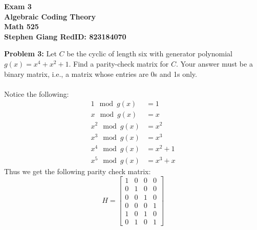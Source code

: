 \documentclass[11pt]{article}
\newcommand{\skipline}{\vspace{\baselineskip}}
\newenvironment{problem}[1]{\textbf{Problem #1: }}{\newpage}
\begin{document}
	
	\begin{center}
		\textbf{Exam 3} \\
		\textbf{Algebraic Coding Theory} \\
		\textbf{Math 525} \\
		\textbf{Stephen Giang RedID: 823184070} \\
		\skipline \skipline
	\end{center}
	
	\begin{problem}{3}
		Let $C$ be the cyclic of length six with generator polynomial $g(x) = x^4 + x^2 + 1$. Find a parity-check matrix for $C$. Your answer must be a binary matrix, i.e., a matrix whose entries are 0s and 1s only.
		\\ \\
		Notice the following:
		\begin{align*}
			1 \mod g(x) &= 1 \\
			x \mod g(x) &= x \\
			x^2 \mod g(x) &= x^2 \\
			x^3 \mod g(x) &= x^3 \\
			x^4 \mod g(x) &= x^2 + 1 \\
			x^5 \mod g(x) &= x^3 + x
		\end{align*}
		Thus we get the following parity check matrix:
		\[H = \left[\begin{array}{cccc}
			1 & 0 & 0 & 0 \\
			0 & 1 & 0 & 0 \\
			0 & 0 & 1 & 0 \\
			0 & 0 & 0 & 1 \\
			1 & 0 & 1 & 0 \\
			0 & 1 & 0 & 1 
		\end{array}\right]\]
	\end{problem}
	
	
\end{document}
